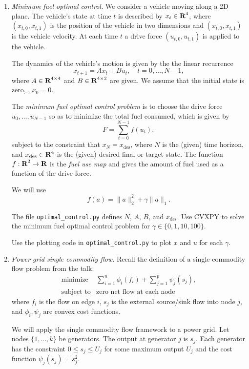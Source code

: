 \documentclass[12pt]{article}
\begin{document}
\begin{enumerate}
\item \emph{Minimum fuel optimal control.}
We consider a vehicle moving along a 2D plane. The vehicle's state at time $t$ is described by $x_t \in {\mbox{\bf R}}^4$, where $(x_{t,0}, x_{t,1})$ is the position of the vehicle in two dimensions and $(x_{t,0}, x_{t,1})$ is the vehicle velocity. At each time $t$ a drive force $(u_{t,0}, u_{t,1})$ is applied to the vehicle.

The dynamics of the vehicle's motion is given by the the linear recurrence
\[
x_{t+1} = Ax_t + Bu_t, \quad t=0, \ldots, N-1,
\]
where $A \in {\mbox{\bf R}}^{4 \times 4}$ and $B \in {\mbox{\bf R}}^{4 \times 2}$ are given. We assume that the initial state is zero, \ie, $x_0 = 0$.

The \emph{minimum fuel optimal control problem}
is to choose the drive force $u_0, \ldots, u_{N-1}$ so as to
minimize the total fuel consumed, which is given by
\[
F = \sum_{t=0}^{N-1} f(u_t),
\]
subject to the constraint that $x_N = x_\mathrm{des}$,
where $N$ is the (given) time horizon, and $x_\mathrm{des} \in {\mbox{\bf R}}^4$
is the (given) desired final or target state.
The function $f:{\mbox{\bf R}}^2 \rightarrow {\mbox{\bf R}}$ is the \emph{fuel use map} and gives the amount of fuel used as a function of the drive force.

We will use
\[
f(a) = \|a\|^2_2 + \gamma\|a\|_1.
\]

The file \verb+optimal_control.py+ defines $N$, $A$, $B$, and $x_\mathrm{des}$. Use CVXPY to solve the minimum fuel optimal control problem for $\gamma \in \{0,1,10,100\}$.

Use the plotting code in \verb+optimal_control.py+ to plot $x$ and $u$ for each $\gamma$.

\item\emph{Power grid single commodity flow.}
Recall the definition of a single commodity flow problem from the talk:
\[
\begin{array}{ll} \mbox{minimize} & \sum_{i=1}^n\phi_{i}(f_{i}) + \sum_{j=1}^p\psi_j(s_j), \\
\mbox{subject to} & \text{zero net flow at each node}
\end{array}
\]
where $f_i$ is the flow on edge $i$, $s_j$ is the external source/sink flow into node $j$, and $\phi_i,\psi_j$ are convex cost functions.

We will apply the single commodity flow framework to a power grid. Let nodes $\{1,\ldots,k\}$ be generators. The output at generator $j$ is $s_j$. Each generator has the constraint $0 \leq s_j \leq U_j$ for some maximum output $U_j$ and the cost function $\psi_j(s_j) = s_j^2$.


\end{enumerate}
\end{document}
